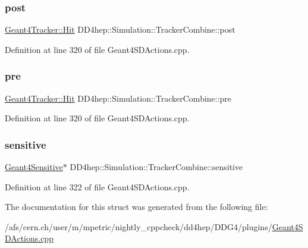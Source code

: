 \subsubsection{\texorpdfstring{post}{post}}
{\footnotesize\ttfamily \hyperlink{class_d_d4hep_1_1_simulation_1_1_geant4_tracker_1_1_hit}{Geant4\+Tracker\+::\+Hit} D\+D4hep\+::\+Simulation\+::\+Tracker\+Combine\+::post}



Definition at line 320 of file Geant4\+S\+D\+Actions.\+cpp.

\hypertarget{struct_d_d4hep_1_1_simulation_1_1_tracker_combine_a05e41bf826c42ad8e4ddefb914a9e079}{}\label{struct_d_d4hep_1_1_simulation_1_1_tracker_combine_a05e41bf826c42ad8e4ddefb914a9e079} 
\subsubsection{\texorpdfstring{pre}{pre}}
{\footnotesize\ttfamily \hyperlink{class_d_d4hep_1_1_simulation_1_1_geant4_tracker_1_1_hit}{Geant4\+Tracker\+::\+Hit} D\+D4hep\+::\+Simulation\+::\+Tracker\+Combine\+::pre}



Definition at line 320 of file Geant4\+S\+D\+Actions.\+cpp.

\hypertarget{struct_d_d4hep_1_1_simulation_1_1_tracker_combine_afa91afc4a7df2a80a889ab1a1ba4d4b6}{}\label{struct_d_d4hep_1_1_simulation_1_1_tracker_combine_afa91afc4a7df2a80a889ab1a1ba4d4b6} 
\subsubsection{\texorpdfstring{sensitive}{sensitive}}
{\footnotesize\ttfamily \hyperlink{class_d_d4hep_1_1_simulation_1_1_geant4_sensitive}{Geant4\+Sensitive}$\ast$ D\+D4hep\+::\+Simulation\+::\+Tracker\+Combine\+::sensitive}



Definition at line 322 of file Geant4\+S\+D\+Actions.\+cpp.



The documentation for this struct was generated from the following file\+:\begin{DoxyCompactItemize}
\item 
/afs/cern.\+ch/user/m/mpetric/nightly\+\_\+cppcheck/dd4hep/\+D\+D\+G4/plugins/\hyperlink{_geant4_s_d_actions_8cpp}{Geant4\+S\+D\+Actions.\+cpp}\end{DoxyCompactItemize}
